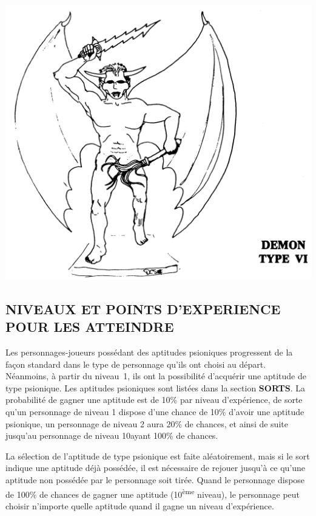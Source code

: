 \documentclass[12pt]{article}
\begin{document}
{\begin{center}
\includegraphics[scale=0.17]{./images/demon-typeVI.jpg}
\end{center}

\subsection*{\normalsize NIVEAUX ET POINTS D'EXPERIENCE POUR LES ATTEINDRE}

Les personnages-joueurs possédant des aptitudes psioniques progressent de la façon standard dans le type de personnage qu'ils ont choisi au départ. Néanmoins, à partir du niveau~1, ils ont la possibilité d'acquérir une aptitude de type psionique. Les aptitudes psioniques sont listées dans la section \textbf{SORTS}. La probabilité de gagner une aptitude est de 10\% par niveau d'expérience, de sorte qu'un personnage de niveau 1 dispose d'une chance de 10\% d'avoir une aptitude psionique, un personnage de niveau 2 aura 20\% de chances, et ainsi de suite jusqu'au personnage de niveau 10ayant 100\% de chances.

\bigskip

La sélection de l'aptitude de type psionique est faite aléatoirement, mais si le sort indique une aptitude déjà possédée, il est nécessaire de rejouer  jusqu'à ce qu'une aptitude non possédée par le personnage soit tirée. Quand le personnage dispose de 100\% de chances de gagner une aptitude (10\textsuperscript{ème} niveau), le personnage peut choisir n'importe quelle aptitude quand il gagne un niveau d'expérience.

}
\end{document}
